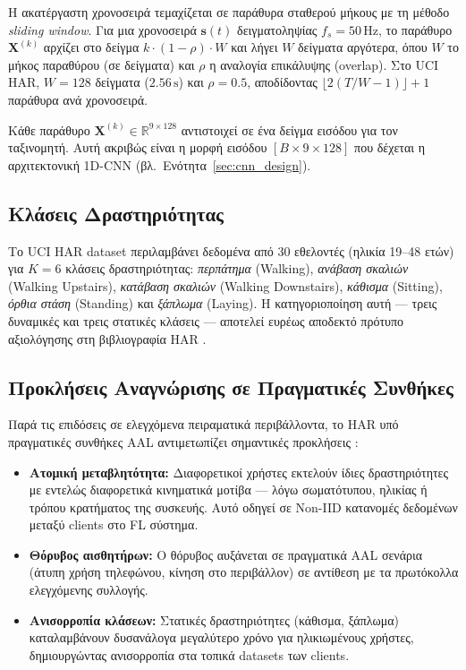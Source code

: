 Η ακατέργαστη χρονοσειρά τεμαχίζεται σε παράθυρα σταθερού μήκους με
τη μέθοδο \textit{sliding window}. Για μια χρονοσειρά $\mathbf{s}(t)$
δειγματοληψίας $f_s = 50\,\text{Hz}$, το παράθυρο $\mathbf{X}^{(k)}$
αρχίζει στο δείγμα $k \cdot (1-\rho) \cdot W$ και λήγει $W$ δείγματα
αργότερα, όπου $W$ το μήκος παραθύρου (σε δείγματα) και $\rho$ η
αναλογία επικάλυψης (overlap). Στο UCI HAR, $W = 128$ δείγματα ($2.56\,\text{s}$)
και $\rho = 0.5$, αποδίδοντας $\lfloor 2(T/W - 1) \rfloor + 1$ παράθυρα
ανά χρονοσειρά.

Κάθε παράθυρο $\mathbf{X}^{(k)} \in \mathbb{R}^{9 \times 128}$
αντιστοιχεί σε ένα δείγμα εισόδου για τον ταξινομητή. Αυτή ακριβώς
είναι η μορφή εισόδου $[B \times 9 \times 128]$ που δέχεται η
αρχιτεκτονική 1D-CNN (βλ.\ Ενότητα~\ref{sec:cnn_design}).

\subsection{Κλάσεις Δραστηριότητας}
\label{subsec:activity_classes}

Το UCI HAR dataset \cite{Anguita2013} περιλαμβάνει δεδομένα από 30
εθελοντές (ηλικία 19--48 ετών) για $K = 6$ κλάσεις δραστηριότητας:
\textit{περπάτημα} (Walking), \textit{ανάβαση σκαλιών} (Walking Upstairs),
\textit{κατάβαση σκαλιών} (Walking Downstairs), \textit{κάθισμα}
(Sitting), \textit{όρθια στάση} (Standing) και \textit{ξάπλωμα}
(Laying). Η κατηγοριοποίηση αυτή — τρεις δυναμικές και τρεις στατικές
κλάσεις — αποτελεί ευρέως αποδεκτό πρότυπο αξιολόγησης στη βιβλιογραφία
HAR \cite{Chen2021}.

\subsection{Προκλήσεις Αναγνώρισης σε Πραγματικές Συνθήκες}
\label{subsec:har_challenges}

Παρά τις επιδόσεις σε ελεγχόμενα πειραματικά περιβάλλοντα, το HAR
υπό πραγματικές συνθήκες AAL αντιμετωπίζει σημαντικές προκλήσεις
\cite{Hammerla2016}:

\begin{itemize}
    \item \textbf{Ατομική μεταβλητότητα:} Διαφορετικοί χρήστες
    εκτελούν ίδιες δραστηριότητες με εντελώς διαφορετικά κινηματικά
    μοτίβα — λόγω σωματότυπου, ηλικίας ή τρόπου κρατήματος της
    συσκευής. Αυτό οδηγεί σε Non-IID κατανομές δεδομένων μεταξύ
    clients στο FL σύστημα.

    \item \textbf{Θόρυβος αισθητήρων:} Ο θόρυβος αυξάνεται σε
    πραγματικά AAL σενάρια (άτυπη χρήση τηλεφώνου, κίνηση στο
    περιβάλλον) σε αντίθεση με τα πρωτόκολλα ελεγχόμενης συλλογής.

    \item \textbf{Ανισορροπία κλάσεων:} Στατικές δραστηριότητες
    (κάθισμα, ξάπλωμα) καταλαμβάνουν δυσανάλογα μεγαλύτερο χρόνο
    για ηλικιωμένους χρήστες, δημιουργώντας ανισορροπία στα τοπικά
    datasets των clients.
\end{itemize}

